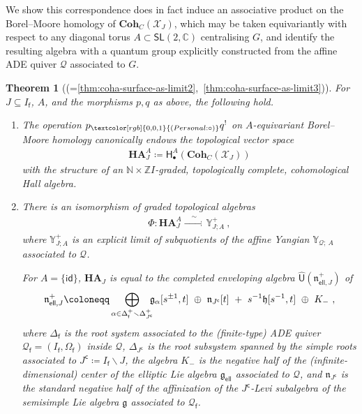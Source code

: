 \documentclass[reqno,a4paper]{amsart}
\newcommand{\personal}[1]{\textcolor[rgb]{0,0,1}{(Personal: #1)}}
\newcommand{\parth}[1]{\textcolor[rgb]{0,1,0}{(Parth: #1)}}
\newcommand{\todo}[1]{\textcolor{red}{(Todo: #1)}}
\newcommand\ast{\personal}[1]{\ignorespaces}
\newcommand\ast{\parth}[1]{\ignorespaces}
\newcommand\ast{\todo}[1]{\ignorespaces}
\newcommand{\calX}{\mathcal{X}}
\newcommand{\C}{\mathbb{C}}
\newcommand{\N}{\mathbb{N}}
\newcommand{\Y}{\mathbb{Y}}
\newcommand{\Z}{\mathbb{Z}}
\newcommand{\sfH}{\mathsf{H}}
\newcommand{\sfU}{\mathsf{U}}
\newcommand{\sff}{\mathsf{f}}
\newcommand{\frakg}{\mathfrak{g}}
\newcommand{\frakh}{\mathfrak{h}}
\newcommand{\frakn}{\mathfrak{n}}
\newcommand{\dstackCoh}{\mathbf{Coh}}
\newcommand{\qv}{\mathcal{Q}}
\newcommand{\qvfin}{\mathcal{Q}_\sff}
\newcommand{\Jcomp}{{J^\mathsf{c}}}
\newcommand{\frakgell}{\mathfrak{g}_{\mathsf{ell}}}
\newcommand{\fraknellJ}{\mathfrak{n}_{\mathsf{ell}, J}}
\newcommand{\coha}{\mathbf{HA}}
\newcommand{\id}{{\mathsf{id}}}
\newcommand{\SL}{\mathsf{SL}}
\theoremstyle{basic-theorem}
\numberwithin{equation}{section}
\newtheorem{theoremintroduction}{Theorem}
\begin{document}
We show this correspondence does in fact induce an associative product on the Borel--Moore homology of $\dstackCoh_C(\calX_J)$, which may be taken equivariantly with respect to any diagonal torus $A\subset \SL(2,\C)$
centralising $G$, and identify the resulting algebra with a quantum group explicitly constructed from the affine ADE quiver $\qv$ associated to $G$.

\begin{theoremintroduction}[{(=\ref{thm:coha-surface-as-limit2},~\ref{thm:coha-surface-as-limit3})}] \label{thm:B}
	For $J \subseteq I_\sff$, $A$, and the morphisms $p,q$ as above, the following hold.
	\begin{enumerate}\itemsep0.2cm
		\item The operation $p_\ast\circ q^!$ on $A$-equivariant Borel--Moore homology canonically endows the topological vector space 
		\begin{align}
			\coha^A_J\coloneqq \sfH_\bullet^A(\dstackCoh_C(\calX_J))
		\end{align}
         with the structure of an $\N \times \Z I$-graded, topologically complete, cohomological Hall algebra.
		
		\item There is an isomorphism of graded topological algebras 
		\begin{align}
            \Phi\colon \coha^A_J \xrightarrow{\quad\sim\quad} \Y^+_{J;A}\ ,
		\end{align} 
        where $\Y^+_{J;A}$ is an explicit limit of subquotients of the affine Yangian $\Y_{\qv;\ A}$ associated to $\qv$. 
        		    

        For $A=\{\id\}$, $\coha_J$ is equal to the completed enveloping algebra $\widehat{\sfU}(\fraknellJ^+)$ of
		\begin{align}%
			\fraknellJ^+\coloneqq \bigoplus_{\alpha \in \Delta^+_\sff \smallsetminus \Delta^+_{\Jcomp}}\hspace{-5pt}\frakg_{\alpha}[s^{\pm 1},t] \ \oplus\   \frakn_{\Jcomp}[t] \ +\  s^{-1}\frakh[s^{-1},t]\  \oplus \ K_-\ ,
		\end{align}
            where $\Delta_\sff$ is the root system associated to the (finite-type) ADE quiver $\qvfin=(I_\sff,\Omega_\sff)$ inside $\qv$, $\Delta_\Jcomp$ is the root subsystem spanned by the simple roots associated to $\Jcomp\coloneqq I_\sff\smallsetminus J$, the algebra $K_-$ is the negative half of the (infinite-dimensional) center of the elliptic Lie algebra $\frakgell$ associated to $\qv$, and $\frakn_{\Jcomp}$ is the standard negative half of the affinization of the $\Jcomp$-Levi subalgebra of the semisimple Lie algebra $\frakg$ associated to $\qvfin$.
	\end{enumerate}
\end{theoremintroduction}
\end{document}
